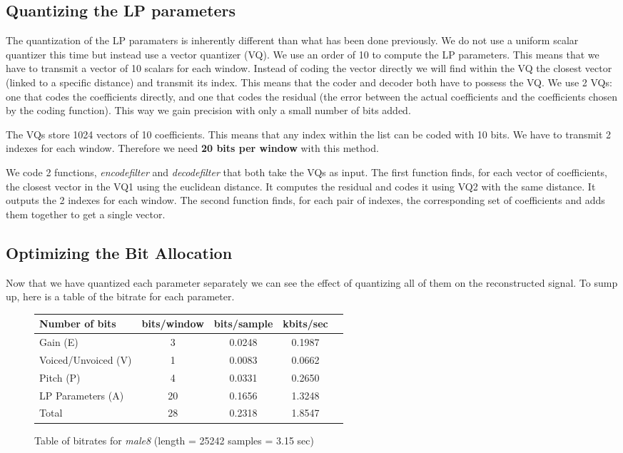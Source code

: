 \subsection{Quantizing the LP parameters}

The quantization of the LP paramaters is inherently different than what has been done previously. We do not use a uniform scalar quantizer this time
but instead use a vector quantizer (VQ). We use an order of 10 to compute the LP parameters. This means that we have to transmit a vector of 10 scalars for each
window. Instead of coding the vector directly we will find within the VQ the closest vector (linked to a specific distance) and transmit its index. This means
that the coder and decoder both have to possess the VQ. We use 2 VQs: one that codes the coefficients directly, and one that codes the residual (the
error between the actual coefficients and the coefficients chosen by the coding function). This way we gain precision with only a small number of bits added.

The VQs store 1024 vectors of 10 coefficients. This means that any index within the list can be coded with 10 bits. We have to transmit 2 indexes for each window.
Therefore we need \textbf{20 bits per window} with this method.

We code 2 functions, \textit{encodefilter} and \textit{decodefilter} that both take the VQs as input. The first function finds, for each vector of coefficients, the
closest vector in the VQ1 using the euclidean distance. It computes the residual and codes it using VQ2 with the same distance. It outputs the 2 indexes for each window.
The second function finds, for each pair of indexes, the corresponding set of coefficients and adds them together to get a single vector. 

\subsection{Optimizing the Bit Allocation}

Now that we have quantized each parameter separately we can see the effect of quantizing all of them on the reconstructed signal. To sump up, here is a table
of the bitrate for each parameter.

\begin{figure}[h!]
\centering
\begin{tabular}{l*{4}{c}}
Number of bits			& bits/window	& bits/sample	& kbits/sec	\\
\hline
Gain (E)			& 3		& 0.0248	& 0.1987	\\
Voiced/Unvoiced (V)		& 1		& 0.0083	& 0.0662	\\
Pitch (P)			& 4		& 0.0331	& 0.2650	\\
LP Parameters (A)		& 20		& 0.1656	& 1.3248	\\
\hline \hline
Total				& 28		& 0.2318	& 1.8547	\\
\end{tabular}
\caption{Table of bitrates for \textit{male8} (length = 25242 samples = 3.15 sec)}
\end{figure}

